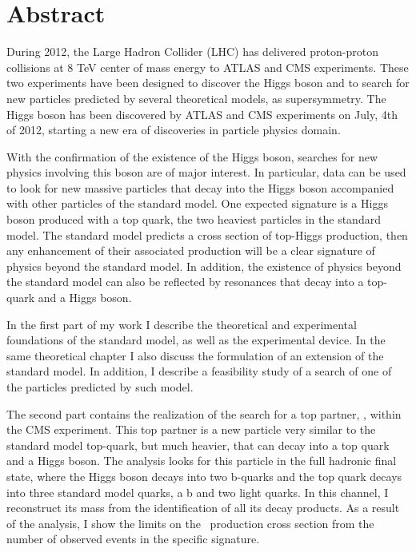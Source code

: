 \begingroup
\let\clearpage\relax
\let\cleardoublepage\relax
\let\cleardoublepage\relax

\chapter*{Abstract}

During 2012, the Large Hadron Collider (LHC) has delivered proton-proton collisions at 8 TeV center of mass energy to ATLAS and CMS experiments. These two experiments have been designed to discover the Higgs boson and to search for new particles predicted by several theoretical models, as supersymmetry. The Higgs boson has been discovered by ATLAS and CMS experiments on July, 4th of 2012, starting a new era of discoveries in particle physics domain. %

With the confirmation of the existence of the Higgs boson, searches for new physics involving this boson are of major interest. In particular, data can be used to look for new massive particles that decay into the Higgs boson accompanied with other particles of the standard model. One expected signature is a Higgs boson produced with a top quark, the two heaviest particles in the standard model. The standard model predicts a cross section of top-Higgs production, then any enhancement of their associated production will be a clear signature of physics beyond the standard model. In addition, the existence of physics beyond the standard model can also be reflected by resonances that decay into a top-quark and a Higgs boson. 

In the first part of my work I describe the theoretical and experimental foundations of the standard model, as well as the experimental device. In the same theoretical chapter I also discuss the formulation of an extension of the standard model. In addition, I describe a feasibility study of a search of one of the particles predicted by such model.

The second part contains the realization of the search for a top partner, \Tp, within the CMS experiment. This top partner is a new particle very similar to the standard model top-quark, but much heavier, that can decay into a top quark and a Higgs boson. The analysis looks for this particle in the full hadronic final state, where the Higgs boson decays into two b-quarks and the top quark decays into three standard model quarks, a b and two light quarks. In this channel, I reconstruct its mass from the identification of all its decay products. As a result of the analysis, I show the limits on the \Tp~production cross section from the number of observed events in the specific signature.

